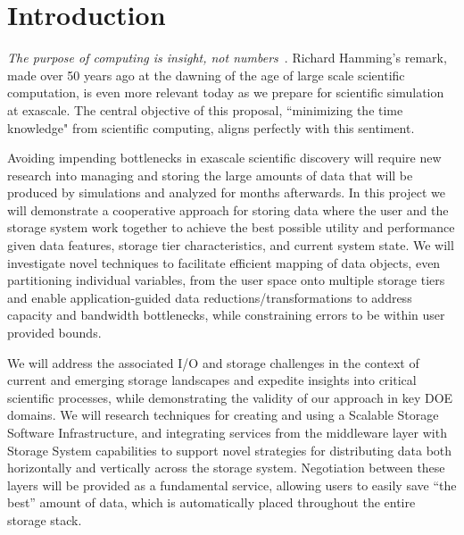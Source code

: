 \section{Introduction} 
\label{sec:introduction}

{\em The purpose of computing is insight, not numbers}~\cite{Hamming:book}.
Richard Hamming's remark, made over 50 years ago at the dawning of the age of
large scale scientific computation, is even more relevant today as we prepare
for scientific simulation at exascale. 
The central objective of this proposal, ``minimizing the time knowledge" from 
scientific computing, aligns perfectly with this sentiment. 

Avoiding impending bottlenecks in exascale scientific discovery will require
new research into managing and storing the large amounts of data that will be
produced by simulations and analyzed for months afterwards.
%
In this project we will demonstrate a cooperative approach for storing data
where the user and the storage system work together to achieve the best
possible utility and performance given data features, storage tier
characteristics, and current system state. We will investigate novel techniques
to facilitate efficient mapping of data objects, even partitioning individual
variables, from the user space onto multiple storage tiers and enable
application-guided data reductions/transformations to address capacity and
bandwidth bottlenecks, while constraining errors to be within user provided
bounds.
% 

We will address the associated I/O and storage challenges in the context of
current and emerging storage landscapes and expedite insights into critical
scientific processes, while demonstrating the validity of our approach in key
DOE domains. We will research techniques for creating and using a Scalable 
Storage Software Infrastructure, and integrating services from the middleware 
layer with Storage System capabilities to support novel strategies for distributing 
data both horizontally and vertically across the storage system.  Negotiation between
these layers will be provided as a fundamental service, allowing users to
easily save ``the best'' amount of data, which is automatically placed throughout the
entire storage stack.


